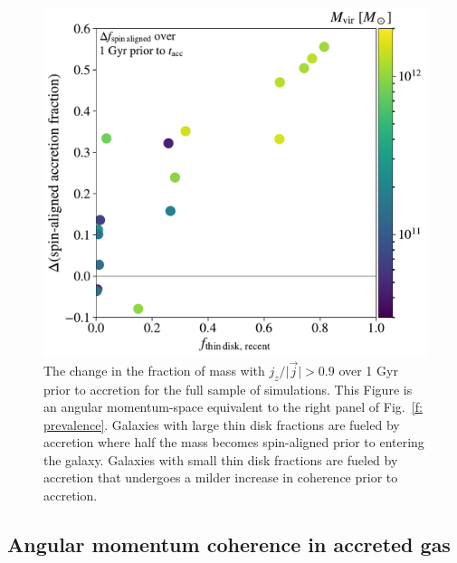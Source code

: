 \documentclass[fleqn,usenatbib]{mnras}
\begin{document}
\begin{figure}
    \centering
    \includegraphics[width=\columnwidth]{figures/variations/relative_to_accretion/prevalence/delta_smooth_jdisk_frac_v_superthin_disk_frac_recent.pdf}
    
    \caption{
    The change in the fraction of mass with $j_z/\vert \vec j \vert > 0.9$ over 1 Gyr prior to accretion for the full sample of simulations.
    This Figure is an angular momentum-space equivalent to the right panel of Fig.~\ref{f: prevalence}.  
    Galaxies with large thin disk fractions are fueled by accretion where half the mass becomes spin-aligned prior to entering the galaxy.
    Galaxies with small thin disk fractions are fueled by accretion that undergoes a milder increase in coherence prior to accretion. 
    }
    \label{f: prevalence - angular momentum}
\end{figure}

\subsection{Angular momentum coherence in accreted gas}
\label{s: mechanics -- coherence}
\end{document}
